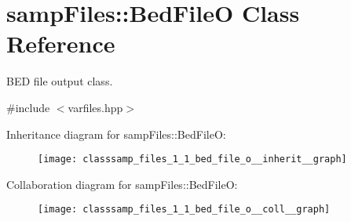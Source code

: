 \hypertarget{classsamp_files_1_1_bed_file_o}{}\section{samp\+Files\+:\+:Bed\+FileO Class Reference}
\label{classsamp_files_1_1_bed_file_o}


B\+ED file output class.  




{\ttfamily \#include $<$varfiles.\+hpp$>$}



Inheritance diagram for samp\+Files\+:\+:Bed\+FileO\+:\nopagebreak
\begin{figure}[H]
\begin{center}
\leavevmode
\texttt{[image: classsamp\_files\_1\_1\_bed\_file\_o\_\_inherit\_\_graph]}
\end{center}
\end{figure}


Collaboration diagram for samp\+Files\+:\+:Bed\+FileO\+:\nopagebreak
\begin{figure}[H]
\begin{center}
\leavevmode
\texttt{[image: classsamp\_files\_1\_1\_bed\_file\_o\_\_coll\_\_graph]}
\end{center}
\end{figure}
